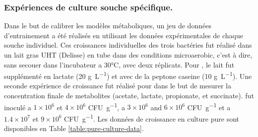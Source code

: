 \documentclass[../main.tex]{subfiles}
\begin{document}
\subsubsection{Expériences de culture souche spécifique.} Dans le but de calibrer les modèles métaboliques, un jeu de données d'entrainement a été réalisés en utilisant les données expérimentales de chaque souche individuel. Ces croissances individuelles des trois bactéries fut réalisé dans un lait gras UHT (Delisse) en tube dans des conditions microaerobic, c'est à dire, sans secouer dans l'incubateur a  30\unit{\degreeCelsius}, avec deux réplicats. Pour \freud, le lait fut supplémenté en lactate (20 \unit{g\per\L}) et avec de la peptone caseine (10 \unit{g\per\L}). Une seconde expérience de croissance fut réalisé pour \freud dans le but de mesurer la concentration finale de metabolites (acetate, lactate, propionate, et succinate). \lactis fut inoculé a $1\times10^{6}$ et $4\times10^{6}$ \unit{CFU\per\g}, \plantarum a $3\times10^{6}$ and $6\times10^{6}$ \unit{CFU\per\g} et \freud a $1.4\times10^{7}$ et $9\times10^{6}$ \unit{CFU\per\g}. Les données de croissance en culture pure sont disponibles en Table \ref{table:pure-culture-data}.
\end{document}
